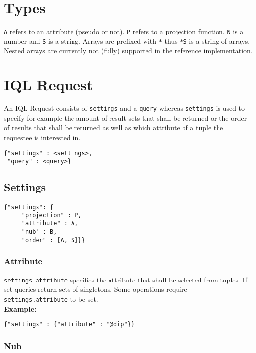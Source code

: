 \documentclass[a4paper]{article}
\begin{document}
\section{Types}

\verb|A| refers to an attribute (pseudo or not). \verb|P| refers to a projection function.
\verb|N| is a number and \verb|S| is a string. Arrays are prefixed with \verb|*| thus \verb|*S| is a string
of arrays. Nested arrays are currently not (fully) supported in the reference implementation.

\section{IQL Request}

An IQL Request consists of \verb|settings| and a \verb|query| whereas
\verb|settings| is used to specify for example the amount of result
sets that shall be returned or the order of results that shall be
returned as well as which attribute of a tuple the requestee is
interested in.

\begin{verbatim}
{"settings" : <settings>,
 "query" : <query>}
\end{verbatim}

\subsection{Settings}

\begin{verbatim}
{"settings": {
     "projection" : P,
     "attribute" : A,
     "nub" : B,
     "order" : [A, S]}}
\end{verbatim}

\subsubsection{Attribute}

\verb|settings.attribute| specifies the attribute that shall be selected from tuples. If set queries return sets of singletons. Some operations require \verb|settings.attribute| to be set. \\

\textbf{Example:}
\begin{verbatim}
{"settings" : {"attribute" : "@dip"}}
\end{verbatim}

\subsubsection{Nub}
\end{document}
